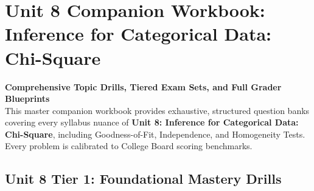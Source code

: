 \chapter{Unit 8 Companion Workbook: Inference for Categorical Data: Chi-Square}
\label{chap:companion_unit_8}
{\large\bfseries\color{MidnightBlue} Comprehensive Topic Drills, Tiered Exam Sets, and Full Grader Blueprints}\\[8pt]
This master companion workbook provides exhaustive, structured question banks covering every syllabus nuance of \textbf{Unit 8: Inference for Categorical Data: Chi-Square}, including Goodness-of-Fit, Independence, and Homogeneity Tests. Every problem is calibrated to College Board scoring benchmarks.\\[12pt]
\section{Unit 8 Tier 1: Foundational Mastery Drills}
